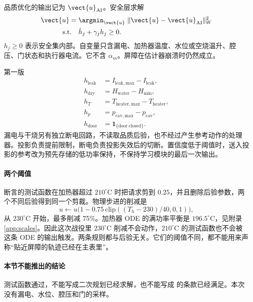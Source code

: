 品质优化的输出记为 \(\vect{u}_{\mathrm{AI}}\)。安全层求解
\begin{equation}
\label{eq:cbf}
\begin{aligned}
\vect{u}={}&\argmin_{\vect{u}}\;\|\vect{u}-\vect{u}_{\mathrm{AI}}\|_W^2\\
\mathrm{s.t.}\quad
&\dot h_j+\gamma_j h_j\ge 0.
\end{aligned}
\end{equation}
\(h_j\ge 0\) 表示安全集内部。自变量只含漏电、加热器温度、水位或空烧温升、腔压、门状态和执行器电流。它不含 \(\alpha_m\)。屏障在估计器崩溃时仍然成立。

第一版
\begin{align}
h_{\mathrm{leak}}&=I_{\mathrm{leak,max}}-I_{\mathrm{leak}},\\
h_{\mathrm{dry}}&=H_{\mathrm{water}}-H_{\min},\\
h_{T}&=T_{\mathrm{heater,max}}-T_{\mathrm{heater}},\\
h_{p}&=p_{\mathrm{cav,max}}-p_{\mathrm{cav}},\\
h_{\mathrm{door}}&=\mathbf{1}_{\{\mathrm{door\ closed}\}}.
\end{align}
漏电与干烧另有独立断电回路，不读取品质后验，也不经过产生参考动作的处理器。投影负责提前限制，断电负责投影失效后的切断。置信度低于阈值时，送入投影的参考改为预先存储的低功率保持，不保持学习模块的最后一次输出。

\paragraph{两个阈值}
断言的测试函数在加热器超过 \(210^\circ\mathrm{C}\) 时把请求剪到 \(0.25\)，并且删除后验参数，两个不同后验得到同一个剪裁。物理步进的削减是
\begin{equation}
u\leftarrow u\big(1-0.75\,\mathrm{clip}((T_h-230)/40,0,1)\big),
\end{equation}
从 \(230^\circ\mathrm{C}\) 开始，最多削减 75\%。加热器 ODE 的满功率平衡是 \(196.5^\circ\mathrm{C}\)，见附录 \ref{app:scales}。因此这次战役里 \(230^\circ\mathrm{C}\) 削减不会动作，\(210^\circ\mathrm{C}\) 的测试函数也不会被这条 ODE 的输出触发。两条规则都与后验无关。它们的阈值不同，都不能用来声称“贴近屏障的轨迹已经在主表里”。

\paragraph{本节不能推出的结论}
测试函数通过，不能写成二次规划已经求解，也不能写成 \cite{iec60335,gb4706} 的条款已经满足。本次没有漏电、水位、腔压和门的采样。

